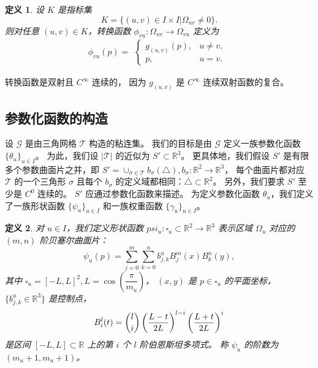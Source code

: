 \documentclass{ctexart}
\newtheorem{Def}{定义}
\begin{document}
		\begin{Def}\label{TF-def}
			设 $K$ 是指标集
			\begin{equation}
				K = \{(u,v)\in I\times I|\Omega_{uv}\neq 0\}.
			\end{equation}
			则对任意 $(u,v)\in K$，转换函数 $\phi_{vu}:\Omega_{uv}\rightarrow \Omega_{vu}$ 定义为
			\begin{equation}
				\phi_{vu}(p) = 
				\begin{aligned}
					\left\{
						\begin{array}{lr}
							g_{(u,v)}(p), & u\neq v, \\
							p, & u = v.
						\end{array}
					\right.
				\end{aligned}
			\end{equation}
		\end{Def}

		转换函数是双射且 $C^{\infty}$ 连续的，
		因为 $g_{(u,v)}$ 是 $C^\infty$ 连续双射函数的复合。
	
	\subsection{参数化函数的构造}
		设 $\mathcal{G}$ 是由三角网格 $\mathcal{T}$ 构造的粘连集。
		我们的目标是由 $\mathcal{G}$ 定义一族参数化函数 $\{\theta_u\}_{u\in I}$。
		为此，我们设 $|\mathcal{T}|$ 的近似为 $S'\subset \mathbb{R}^3$。
		更具体地，我们假设 $S'$ 是有限多个参数曲面片之并，即
		$S' = \cup_{\sigma\in \mathcal{T}}b_{\sigma}(\triangle),b_{\sigma}: \mathbb{R}^2 \rightarrow \mathbb{R}^3$，
		每个曲面片都对应 $\mathcal{T}$ 的一个三角形 $\sigma$ 且每个 $b_\sigma$ 的定义域都相同：$\triangle \subset \mathbb{R}^2$。
		另外，我们要求 $S'$ 至少是 $C^0$ 连续的。
		$S'$ 应通过参数化函数来描述。
		为定义参数化函数 $\theta_u$，我们定义了一族形状函数 $\{\psi_u\}_{u\in I}$ 和一族权重函数 $\{\gamma_u\}_{u\in I}$。
		
		\begin{Def}\label{SF-def}
			对 $u\in I$，我们定义形状函数 $psi_u:\square_u\subset \mathbb{R}^2\rightarrow \mathbb{R}^3$
			表示区域 $\Omega_u$ 对应的 $(m,n)$ 阶贝塞尔曲面片：
			\begin{equation}
				\psi_u(p) = \sum_{j=0}^m\sum_{k=0}^n b_{j,k}^u B_j^m(x) B_k^n(y),
			\end{equation}
			其中 $\square_u = [-L,L]^2,L=\cos(\dfrac{\pi}{m_u})$，
			$(x,y)$ 是 $p\in \square_u$ 的平面坐标，
			$\{b_{j,k}^u\in \mathbb{R}^3\}$ 是控制点，
			\begin{equation}
				B_i^l(t)=\dbinom{l}{i}\left(\dfrac{L-t}{2L}\right)^{l-i}\left(\dfrac{L+t}{2L}\right)^i
			\end{equation}
			是区间 $[-L,L]\subset \mathbb{R}$ 上的第 $i$ 个 $l$ 阶伯恩斯坦多项式。
			称 $\psi_u$ 的阶数为 $(m_u+1,m_u+1)$。
		\end{Def}
\end{document}
